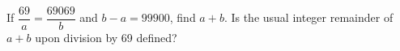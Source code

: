 If $\dfrac{69}{a}=\dfrac{69069}{b}$ and $b-a=99900$, find $a+b$. Is the usual integer remainder of $a+b$ upon division by 69 defined?

